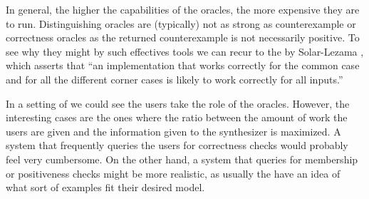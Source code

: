 In general, the higher the capabilities of the oracles, the more expensive they
are to run. Distinguishing oracles are (typically) not as strong as
counterexample or correctness oracles as the returned counterexample is not
necessarily positive. To see why they might by such effectives tools we can
recur to the   by Solar-Lezama \cite{Solar-Lezama:2008}, which
asserts that ``an implementation that works correctly for the common case and
for all the different corner cases is likely to work correctly for all inputs.''

In a setting of  we could see the
users take the role of the oracles. However, the interesting cases are the ones
where the ratio between the amount of work the users are given and the
information given to the synthesizer is maximized. A system that frequently
queries the users for correctness checks would probably feel very cumbersome. On
the other hand, a system that queries for membership or positiveness checks
might be more realistic, as usually the  have an idea of what sort of examples fit their desired
model.

